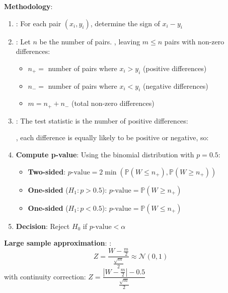 \textbf{Methodology}:
\begin{enumerate}
    \item {}: For each pair $(x_i, y_i)$, determine the sign of $x_i - y_i$

    \item {}: Let $n$ be the number of pairs. ,
        leaving $m \leq n$ pairs with non-zero differences:
        \begin{itemize}
            \item $n_+ = $ number of pairs where $x_i > y_i$ (positive differences)
            \item $n_- = $ number of pairs where $x_i < y_i$ (negative differences)
            \item $m = n_+ + n_-$ (total non-zero differences)
        \end{itemize}

    \item {}: The test statistic is the number of positive differences:
        \begin{center}
        \end{center}
        , each difference is equally likely to be positive or negative, so:
        \begin{center}
        \end{center}

    \item \textbf{Compute p-value}: Using the binomial distribution with $p=0.5$:
        \begin{itemize}
            \item \textbf{Two-sided}: $p\text{-value} = 2\min\left(\mathbb{P}(W \leq n_+), \mathbb{P}(W \geq n_+)\right)$
            \item \textbf{One-sided} ($H_1: p > 0.5$): $p\text{-value} = \mathbb{P}(W \geq n_+)$
            \item \textbf{One-sided} ($H_1: p < 0.5$): $p\text{-value} = \mathbb{P}(W \leq n_+)$
        \end{itemize}

    \item \textbf{Decision}: Reject $H_0$ if $p\text{-value} < \alpha$
\end{enumerate}

\textbf{Large sample approximation}: :
$$Z = \dfrac{W - \frac{m}{2}}{\frac{\sqrt{m}}{2}} \approx \mathcal{N}(0, 1)$$
with continuity correction: $Z = \dfrac{|W - \frac{m}{2}| - 0.5}{\frac{\sqrt{m}}{2}}$

